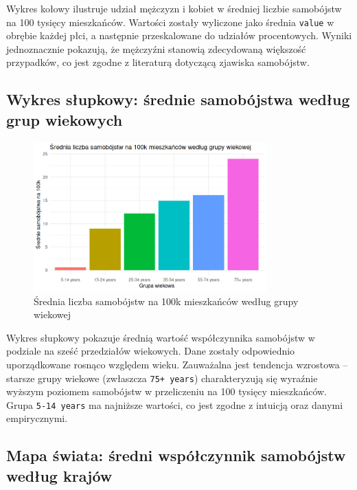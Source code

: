 \documentclass[polish]{article}
\begin{document}
    Wykres kołowy ilustruje udział mężczyzn i kobiet w średniej liczbie samobójstw na 100 tysięcy mieszkańców. Wartości zostały wyliczone jako średnia \texttt{value} w obrębie każdej płci, a następnie przeskalowane do udziałów procentowych. Wyniki jednoznacznie pokazują, że mężczyźni stanowią zdecydowaną większość przypadków, co jest zgodne z literaturą dotyczącą zjawiska samobójstw.

    \subsection{Wykres słupkowy: średnie samobójstwa według grup wiekowych}

    \begin{figure}[H]
    \centering
    \includegraphics[width=0.8\textwidth]{img/bar_age.png}
    \caption{Średnia liczba samobójstw na 100k mieszkańców według grupy wiekowej}
    \end{figure}

    Wykres słupkowy pokazuje średnią wartość współczynnika samobójstw w podziale na sześć przedziałów wiekowych. Dane zostały odpowiednio uporządkowane rosnąco względem wieku. Zauważalna jest tendencja wzrostowa – starsze grupy wiekowe (zwłaszcza \texttt{75+ years}) charakteryzują się wyraźnie wyższym poziomem samobójstw w przeliczeniu na 100 tysięcy mieszkańców. Grupa \texttt{5-14 years} ma najniższe wartości, co jest zgodne z intuicją oraz danymi empirycznymi.

    \subsection{Mapa świata: średni współczynnik samobójstw według krajów}
\end{document}
